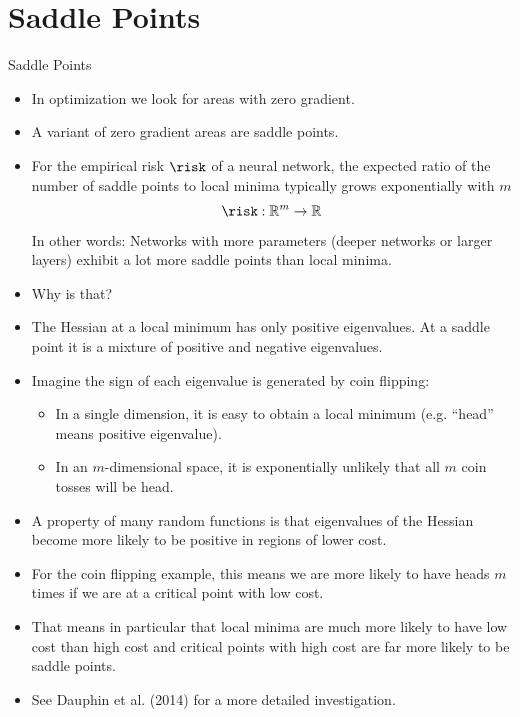 \section{Saddle Points}
\begin{vbframe}{Saddle Points}
  \begin{itemize}
    \item In optimization we look for areas with zero gradient.
    \item A variant of zero gradient areas are saddle points.
    \item For the empirical risk $\risk$ of a neural network, the expected ratio of the number of saddle points to local minima typically grows exponentially with $m$ 
    $$\risk: \mathbb{R}^m \rightarrow \mathbb{R}$$ 
    In other words: Networks with more parameters (deeper networks or larger layers) exhibit a lot more saddle points than local minima.
     \item Why is that?
    \item The Hessian at a local minimum has only positive eigenvalues. At a saddle point it is a mixture of positive and negative eigenvalues.
    
\framebreak
    
    \item Imagine the sign of each eigenvalue is generated by coin flipping:
    \begin{itemize}
      \item In a single dimension, it is easy to obtain a local minimum (e.g. \enquote{head} means positive eigenvalue).
      \item In an $m$-dimensional space, it is exponentially unlikely that all $m$ coin tosses will be head.
    \end{itemize}
    \item A property of many random functions is that eigenvalues of the Hessian become more likely to be positive in regions of lower cost.
    \item For the coin flipping example, this means we are more likely to have heads $m$ times if we are at a critical point with low cost.
    \item That means in particular that local minima are much more likely to have low cost than high cost and critical points with high cost are far more likely to be saddle points.
    \item See Dauphin et al. (2014) for a more detailed investigation.
  \end{itemize}
\end{vbframe}

